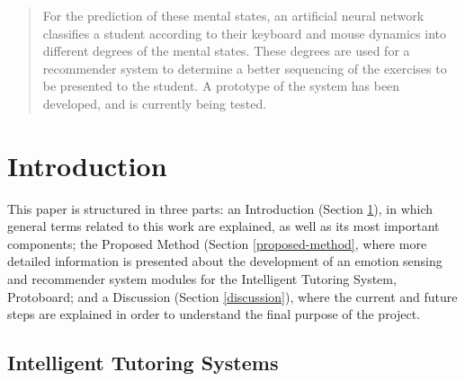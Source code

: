 \documentclass{acm_proc_article-sp}
\begin{document}
\begin{abstract}
For the prediction of these mental states, an artificial neural
network classifies a student according to their keyboard and mouse dynamics into different degrees of the mental states. 
These degrees are used 
for a recommender %
system to determine a better sequencing of the exercises to be
presented to the student. A prototype of the system has been
developed, and is currently being tested.
%  

\end{abstract}




\section{Introduction}
\label{introduction}

This paper is structured in three parts: an Introduction (Section
\ref{introduction}), in which general terms related to this work are
explained, as well as its most important components; the Proposed
Method (Section \ref{proposed-method}, where more detailed information
is presented about the development of an emotion sensing and
recommender system modules for the Intelligent Tutoring System,
Protoboard; and a Discussion (Section \ref{discussion}), where the
current and future steps are explained in order to understand the
final purpose of the project.


\subsection{Intelligent Tutoring Systems}
\label{ITSs}
\end{document}
